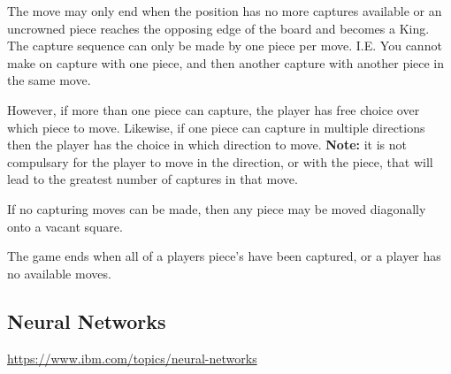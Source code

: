 \documentclass{article}
\begin{document}
    The move may only end when the position has no more captures available or an uncrowned piece reaches the opposing edge
    of the board and becomes a King. The capture sequence can only be made by one piece per move. I.E. You cannot make on capture with one piece, and then another capture with another piece in the same move.

    However, if more than one piece can capture, the player has free choice over which piece to move. Likewise, if one piece can capture in multiple
    directions then the player has the choice in which direction to move. \textbf{Note:} it is not compulsary for the player to move in the direction, or with the piece,
    that will lead to the greatest number of captures in that move.

    If no capturing moves can be made, then any piece may be moved diagonally onto a vacant square.

    The game ends when all of a players piece's have been captured, or a player has no available moves.

    \subsection{Neural Networks}
    \noindent \url{https://www.ibm.com/topics/neural-networks}
\end{document}

